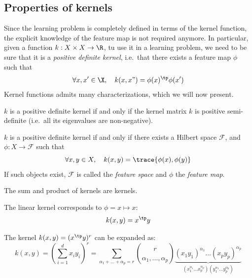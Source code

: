 \documentclass[toc]{../cs-classes/cs-classes}
\begin{document}
\subsection{Properties of kernels}
Since the learning problem is completely defined in terms of the kernel function, the explicit knowledge of the feature map is not required anymore. In particular, given a function $k:X\times X \to \R$, tu use it in a learning problem, we need to be sure that it is a \emph{positive definite kernel}, i.e.~that there exists a feature map $\phi$ such that
\begin{equation*}
    \forall x, x'\in\X, \quad k(x, x") = \phi(x)^\tp \phi(x')
\end{equation*}
Kernel functions admits many characterizations, which we will now present.

\begin{property}
    $k$ is a positive definite kernel if and only if the kernel matrix $k$ is positive semi-definite (i.e.~all its eigenvalues are non-negative).
\end{property}

\begin{theorem}[Aronsazjn]
    $k$ is a positive definite kernel if and only if there exists a Hilbert space $\mathcal{F}$, and $\phi:X\to\mathcal{F}$ such that
    \begin{equation*}
        \forall x, y\in X, \quad k(x, y) = \trace{\phi(x), \phi(y)}
    \end{equation*}
    If such objects exist, $\mathcal{F}$ is called the \emph{feature space} and $\phi$ the \emph{feature map}.
\end{theorem}

\begin{property}
    The sum and product of kernels are kernels.
\end{property}

\begin{example}
    The linear kernel corresponds to $\phi = x \mapsto x$:
    \begin{equation*}
        k(x, y) = x^\tp y
    \end{equation*}
\end{example}

\begin{example}
    The kernel $k(x, y) = (x^\tp y)^r$ can be expanded as:
    \begin{equation*}
        k(x, y) = \left(\sum_{i=1}^d x_iy_i\right)^r = \sum_{\alpha_1 + \dots + \alpha_p=r} \binom{r}{\alpha_1, \dots, \alpha_p} \underbrace{(x_1y_1)^{\alpha_1} \dots (x_py_p)^{\alpha_p}}_{(x_1^{\alpha_1}\dots x_p^{\alpha_p})(y_1^{\alpha_1}\dots y_p^{\alpha_p})}
    \end{equation*}
\end{example}
\end{document}
